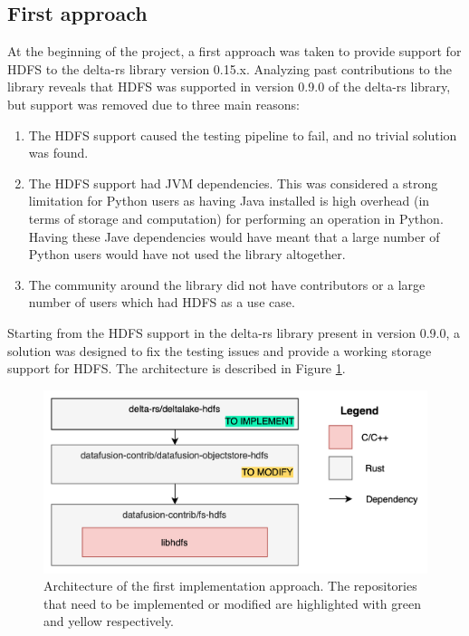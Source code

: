 \subsection{First approach}
At the beginning of the project, a first approach was taken to provide support for \gls{HDFS} to the delta-rs library version 0.15.x. Analyzing past contributions to the library reveals that \gls{HDFS} was supported in version 0.9.0 of the delta-rs library, but support was removed due to three main reasons:
\begin{enumerate}
  \item The \gls{HDFS} support caused the testing pipeline to fail, and no trivial solution was found.
  \item The \gls{HDFS} support had \gls{JVM} dependencies. This was considered a strong limitation for Python users as having Java installed is high overhead (in terms of storage and computation) for performing an operation in Python. Having these Jave dependencies would have meant that a large number of Python users would have not used the library altogether.
  \item The community around the library did not have contributors or a large number of users which had \gls{HDFS} as a use case.
\end{enumerate}
Starting from the \gls{HDFS} support in the delta-rs library present in version 0.9.0, a solution was designed to fix the testing issues and provide a working storage support for \gls{HDFS}. The architecture is described in Figure \ref{fig:approach_1_solution_schema}. 

\begin{figure}[!ht]
  \begin{center}
    \includegraphics[width=\textwidth]{figures/4-implementation/approach1_solution_schema.png}
  \caption[First solution architecture]{Architecture of the first implementation approach. The repositories that need to be implemented or modified are highlighted with green and yellow respectively.}
  \label{fig:approach_1_solution_schema}
  \end{center}
\end{figure}

